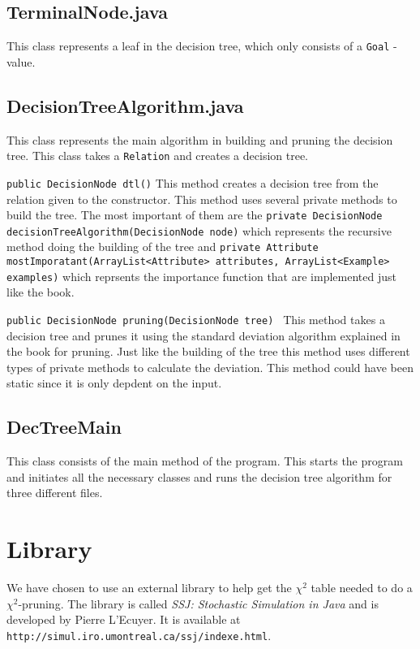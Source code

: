 \documentclass[a4paper]{article}
\begin{document}
\subsection{TerminalNode.java}
This class represents a leaf in the decision tree, which only consists of a \texttt{Goal} - value. 
\subsection{DecisionTreeAlgorithm.java}
This class represents the main algorithm in building and pruning the decision tree. This class takes a \texttt{Relation} and creates a decision tree.
\item[\texttt{public DecisionNode dtl()}] This method creates a decision tree from the relation given to the constructor. This method uses several private methods to build the tree. The most important of them are the \texttt{private DecisionNode decisionTreeAlgorithm(DecisionNode node)} which represents the recursive method doing the building of the tree and \texttt{private Attribute mostImporatant(ArrayList<Attribute> attributes, ArrayList<Example> examples)} which reprsents the importance function that are implemented just like the book. 
\item[\texttt{public DecisionNode pruning(DecisionNode tree) }] This method takes a decision tree and prunes it using the standard deviation algorithm explained in the book for pruning. Just like the building of the tree this method uses different types of private methods to calculate the deviation. This method could have been static since it is only depdent on the input. 
\subsection{DecTreeMain}
This class consists of the main method of the program. This starts the program and initiates all the necessary classes and runs the decision tree algorithm for three different files.

\section{Library}
We have chosen to use an external library to help get the $\chi^{2}$ table needed to do a $\chi^{2}$-pruning. The library is called \emph{SSJ: Stochastic Simulation in Java} and is developed by Pierre L'Ecuyer. It is available at \texttt{http://simul.iro.umontreal.ca/ssj/indexe.html}.
\end{document}
